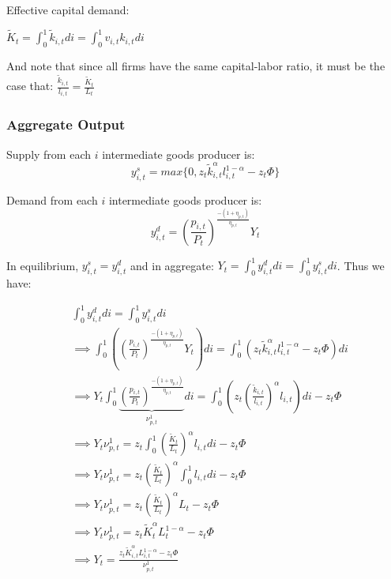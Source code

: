 \documentclass[article,11pt,letterpaper,fleqn]{article}
\theoremstyle{definition}
\numberwithin{equation}{section}
\begin{document}
Effective capital demand:

$\tilde{K}_{t} = \int_{0}^{1}\tilde{k}_{i,t}di=  \int_{0}^{1}v_{i,t}k_{i,t}di $

And note that since all firms have the same capital-labor ratio, it must be the case that: $\frac{\tilde{k}_{i,t}}{l_{i,t}}=\frac{\tilde{K}_{t}}{L_{t}}$

\subsubsection{Aggregate Output}
Supply from each $i$ intermediate goods producer is:
\begin{equation}
y^{s}_{i,t} = max\{0,z_{t}\tilde{k}^{\alpha}_{i,t}l^{1-\alpha}_{i,t}-z_{t}\Phi\}
\end{equation}

Demand from each $i$ intermediate goods producer is:
\begin{equation}
y^{d}_{i,t} = \left(\frac{p_{i,t}}{P_{t}}\right)^{\frac{-(1+\eta_{p,t})}{\eta_{p,t}}}Y_{t}
\end{equation}

In equilibrium, $y^{s}_{i,t}=y^{d}_{i,t}$ and in aggregate: $Y_{t}=\int_{0}^{1}y^{d}_{i,t}di = \int_{0}^{1}y^{s}_{i,t}di$.  Thus we have:

\begin{equation}
\begin{split}
\label{aggY}
& \int_{0}^{1}y^{d}_{i,t}di = \int_{0}^{1}y^{s}_{i,t}di \\
 & \implies  \int_{0}^{1}\left( \left(\frac{p_{i,t}}{P_{t}}\right)^{\frac{-(1+\eta_{p,t})}{\eta_{p,t}}}Y_{t}\right)di = \int_{0}^{1}\left(z_{t}\tilde{k}^{\alpha}_{i,t}l^{1-\alpha}_{i,t}-z_{t}\Phi\right)di \\
  & \implies  Y_{t} \int_{0}^{1} \underbrace{\left(\frac{p_{i,t}}{P_{t}}\right)^{\frac{-(1+\eta_{p,t})}{\eta_{p,t}}}}_{\nu^{1}_{p,t}}di = \int_{0}^{1}\left(z_{t}\left(\frac{\tilde{k}_{i,t}}{l_{i,t}}\right)^{\alpha}l_{i,t}\right)di-z_{t}\Phi \\
  & \implies  Y_{t} \nu^{1}_{p,t} = z_{t}\int_{0}^{1}\left(\frac{\tilde{K}_{t}}{L_{t}}\right)^{\alpha}l_{i,t}di-z_{t}\Phi \\
   & \implies  Y_{t} \nu^{1}_{p,t} = z_{t}\left(\frac{\tilde{K}_{t}}{L_{t}}\right)^{\alpha}\int_{0}^{1}l_{i,t}di-z_{t}\Phi \\
    & \implies  Y_{t} \nu^{1}_{p,t} = z_{t}\left(\frac{\tilde{K}_{t}}{L_{t}}\right)^{\alpha}L_{t}-z_{t}\Phi \\
    & \implies  Y_{t} \nu^{1}_{p,t} = z_{t}\tilde{K}_{t}^{\alpha}L_{t}^{1-\alpha}-z_{t}\Phi \\
    & \implies Y_{t} = \frac{z_{t}\tilde{K}_{i,t}^{\alpha}L_{i,t}^{1-\alpha}-z_{t}\Phi}{\nu^{1}_{p,t}} 
\end{split}
\end{equation}
\end{document}
